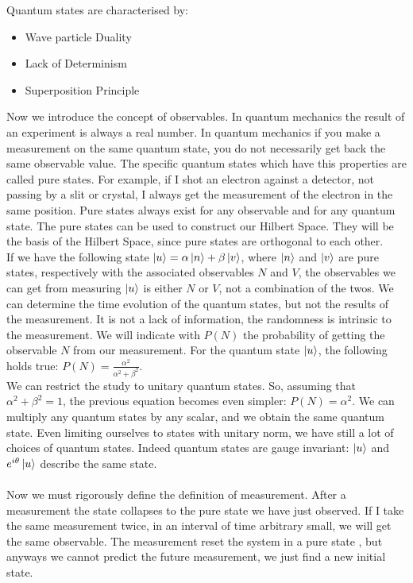 \documentclass{article}
\begin{document}
Quantum states are characterised by:
\begin{itemize}
    \item Wave particle Duality
    \item  Lack of Determinism
    \item Superposition Principle
\end{itemize}
Now we introduce the concept of observables. In quantum mechanics the result of an experiment is always a real number. In quantum mechanics if you make a measurement on the same quantum state, you do not necessarily get back the same observable value. The specific quantum states which have this properties are called pure states.
For example, if I shot an electron against a detector, not passing by a slit or crystal, I always get the measurement of the electron in the same position. Pure states always exist for any observable and for any quantum state. The pure states can be used to construct our Hilbert Space. They will be the basis of the Hilbert Space, since pure states are orthogonal to each other. \\
If we have the following state $\ket{u} = \alpha \ket{n} + \beta \ket{v}$, where $\ket{n}$ and $\ket{v}$ are pure states, respectively with the associated observables $N$ and $V$, the observables we can get from measuring $\ket{u}$ is either $N$ or $V$, not a combination of the twos. We can determine the time evolution of the quantum states, but not the results of the measurement. It is not a lack of information, the randomness is intrinsic to the measurement.
We will indicate with $P(N)$ the probability of getting the observable $N$ from our measurement.
For the quantum state $\ket{u}$, the following holds true:  $P(N) = \frac{\alpha^2}{\alpha^2+\beta^2}$.\\
We can restrict the study to unitary quantum states. So, assuming that $\alpha^2 + \beta^2 = 1 $, the previous equation becomes even simpler: $P(N) = \alpha^2$.
We can multiply any quantum states by any scalar, and we obtain the same quantum state.  Even limiting ourselves to states with unitary norm, we have still a lot of choices of quantum states. 
Indeed quantum states are gauge invariant: $\ket{u} $ and $ e^{i\theta} \ket{u}$ describe the same state.\\ \\
Now we must rigorously define the definition of measurement. After a measurement the state collapses to the pure state we have just observed. If I take the same measurement twice, in an interval of time arbitrary small, we will get the same observable.
The measurement reset the system in a pure state , but anyways we cannot predict the future measurement, we just find a new initial state.
\end{document}
